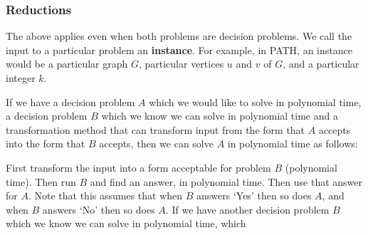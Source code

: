 \subsubsection{Reductions}
The above applies even when both problems are decision problems. We call
the input to a particular problem an \textbf{instance}. For example, in PATH,
an instance would be a particular graph $G$, particular vertices $u$ and $v$
of $G$, and a particular integer $k$.

If we have a decision problem $A$ which we would like to solve in polynomial time, a decision
problem $B$ which we know we can solve in polynomial time and a transformation method that can
transform input from the form that $A$ accepts into the form that $B$ accepts, then we can solve
$A$ in polynomial time as follows:

First transform the input into a form acceptable for problem $B$ (polynomial time). Then run $B$ and
find an answer, in polynomial time. Then use that answer for $A$. Note that this assumes that when $B$
answers `Yes' then so does $A$, and when $B$ answers `No' then so does $A$.
If we have another decision problem $B$ which we know we can solve in polynomial time, which
